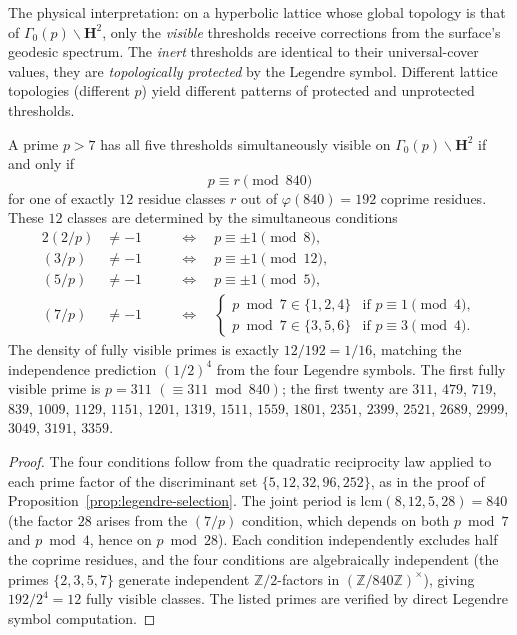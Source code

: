 \noindent
The physical interpretation: on a hyperbolic lattice whose
global topology is that of $\Gamma_0(p)\backslash\mathbf{H}^2$,
only the \emph{visible} thresholds receive corrections from
the surface's geodesic spectrum.  The \emph{inert} thresholds
are identical to their universal-cover values, they are
\emph{topologically protected} by the Legendre symbol.
Different lattice topologies (different $p$) yield different
patterns of protected and unprotected thresholds.

\begin{corollary}
\label{cor:fully-visible}
A prime $p > 7$ has all five thresholds simultaneously visible
on $\Gamma_0(p)\backslash\mathbf{H}^2$ if and only if
\[
  p \equiv r \pmod{840}
\]
for one of exactly $12$ residue classes $r$ out of
$\varphi(840) = 192$ coprime residues.
These $12$ classes are determined by the simultaneous conditions
\begin{alignat*}{2}
  (2/p) &\ne -1 &\quad&\Longleftrightarrow\quad p \equiv \pm 1 \pmod{8}, \\
  (3/p) &\ne -1 &&\Longleftrightarrow\quad p \equiv \pm 1 \pmod{12}, \\
  (5/p) &\ne -1 &&\Longleftrightarrow\quad p \equiv \pm 1 \pmod{5}, \\
  (7/p) &\ne -1 &&\Longleftrightarrow\quad
    \begin{cases} p \bmod 7 \in \{1,2,4\} & \text{if } p\equiv 1\!\!\pmod{4},\\
                  p \bmod 7 \in \{3,5,6\} & \text{if } p\equiv 3\!\!\pmod{4}.
    \end{cases}
\end{alignat*}
The density of fully visible primes is exactly $12/192 = 1/16$,
matching the independence prediction $(1/2)^4$ from the four
Legendre symbols.
The first fully visible prime is $p = 311$ $(\equiv 311 \bmod 840)$;
the first twenty are $311$, $479$, $719$, $839$, $1009$, $1129$,
$1151$, $1201$, $1319$, $1511$, $1559$, $1801$, $2351$, $2399$,
$2521$, $2689$, $2999$, $3049$, $3191$, $3359$.
\end{corollary}

\begin{proof}
The four conditions follow from the quadratic reciprocity law
applied to each prime factor of the discriminant set
$\{5, 12, 32, 96, 252\}$, as in the proof of
Proposition~\ref{prop:legendre-selection}.
The joint period is $\mathrm{lcm}(8, 12, 5, 28) = 840$
(the factor $28$ arises from the $(7/p)$ condition, which depends
on both $p \bmod 7$ and $p \bmod 4$, hence on $p \bmod 28$).
Each condition independently excludes half the coprime residues,
and the four conditions are algebraically independent
(the primes $\{2, 3, 5, 7\}$ generate independent
$\mathbb{Z}/2$-factors in
$(\mathbb{Z}/840\mathbb{Z})^\times$),
giving $192/2^4 = 12$ fully visible classes.
The listed primes are verified by direct Legendre symbol computation.
\end{proof}

